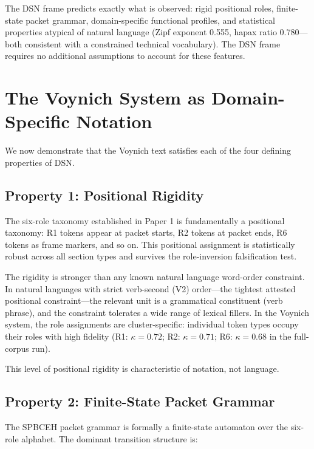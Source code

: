 \documentclass[11pt,a4paper,twocolumn]{article}
\begin{document}
The DSN frame predicts exactly what is observed: rigid positional roles, finite-state packet grammar, domain-specific functional profiles, and statistical properties atypical of natural language (Zipf exponent 0.555, hapax ratio 0.780---both consistent with a constrained technical vocabulary). The DSN frame requires no additional assumptions to account for these features.

\section{The Voynich System as Domain-Specific Notation}
\label{sec:vm_as_dsn}

We now demonstrate that the Voynich text satisfies each of the four defining properties of DSN.

\subsection{Property 1: Positional Rigidity}

The six-role taxonomy established in Paper 1 is fundamentally a positional taxonomy: R1 tokens appear at packet starts, R2 tokens at packet ends, R6 tokens as frame markers, and so on. This positional assignment is statistically robust across all section types and survives the role-inversion falsification test.

The rigidity is stronger than any known natural language word-order constraint. In natural languages with strict verb-second (V2) order---the tightest attested positional constraint---the relevant unit is a grammatical constituent (verb phrase), and the constraint tolerates a wide range of lexical fillers. In the Voynich system, the role assignments are cluster-specific: individual token types occupy their roles with high fidelity (R1: $\kappa = 0.72$; R2: $\kappa = 0.71$; R6: $\kappa = 0.68$ in the full-corpus run).

This level of positional rigidity is characteristic of notation, not language.

\subsection{Property 2: Finite-State Packet Grammar}

The SPBCEH packet grammar is formally a finite-state automaton over the six-role alphabet. The dominant transition structure is:
\end{document}
